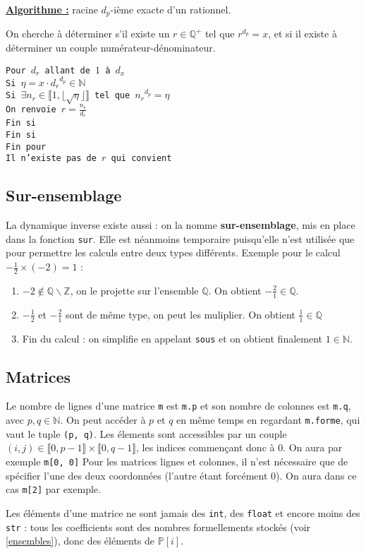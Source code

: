 \documentclass[french]{article}
\newcommand{\p}{\texttt} %
\newcommand{\tab}{\hspace*{5mm}}
\newcommand{\floor}[1]{\lfloor #1 \rfloor} %
\begin{document}
\noindent \textbf{\underline{Algorithme :}} racine $d_p$-ième exacte d'un rationnel.

\noindent On cherche à déterminer s'il existe un $r \in \mathbb{Q}^+$ tel que $r^{d_p} = x$, et si il existe à déterminer un couple numérateur-dénominateur.

\noindent\texttt{Pour $d_r$ allant de $1$ à $d_x$ \\
\tab Si $\eta = x \cdot {d_r}^{d_p} \in \mathbb{N}$ \\
\tab\tab Si $\exists n_r \in \llbracket 1, \floor{\sqrt{\eta}} \rrbracket$ tel que ${n_r}^{d_p} = \eta$ \\
\tab\tab\tab On renvoie $r = \frac{n_r}{d_r}$ \\
\tab\tab Fin si \\
\tab Fin si \\
Fin pour\\
Il n'existe pas de $r$ qui convient}


\subsection{Sur-ensemblage}

La dynamique inverse existe aussi : on la nomme \textbf{sur-ensemblage}, mis en place dans la fonction \p{sur}. Elle est néanmoins temporaire puisqu'elle n'est utilisée que pour permettre les calculs entre deux types différents.
Exemple pour le calcul $-\frac{1}{2} \times (-2) = 1$ :
\begin{enumerate}
  \item $-2 \not\in \mathbb{Q} \backslash \mathbb{Z} $, on le projette sur l'ensemble $\mathbb{Q}$. On obtient $-\frac{2}{1} \in \mathbb{Q}$.
  \item $-\frac{1}{2}$ et $-\frac{2}{1}$ sont de même type, on peut les muliplier. On obtient $\frac{1}{1} \in \mathbb{Q}$
  \item Fin du calcul : on simplifie en appelant \p{sous} et on obtient finalement $1 \in \mathbb{N}$.
\end{enumerate}

\subsection{Matrices}

Le nombre de lignes d'une matrice \p{m} est \p{m.p} et son nombre de colonnes est \p{m.q}, avec $p, q \in \mathbb{N}$. On peut accéder à $p$ et $q$ en même temps en regardant \p{m.forme}, qui vaut le tuple \p{(p, q)}. Les élements sont accessibles par un couple $(i, j) \in \llbracket 0, p -1 \rrbracket \times \llbracket 0, q -1 \rrbracket$, les indices commençant donc à 0. On aura par exemple \p{m[0, 0]} Pour les matrices lignes et colonnes, il n'est nécessaire que de spécifier l'une des deux coordonnées (l'autre étant forcément 0). On aura dans ce cas \p{m[2]} par exemple.

Les éléments d'une matrice ne sont jamais des \p{int}, des \p{float} et encore moins des \p{str} : tous les coefficients sont des nombres formellements stockés (voir \ref{ensembles}), donc des éléments de $\mathbb{P}[i]$.
\end{document}

